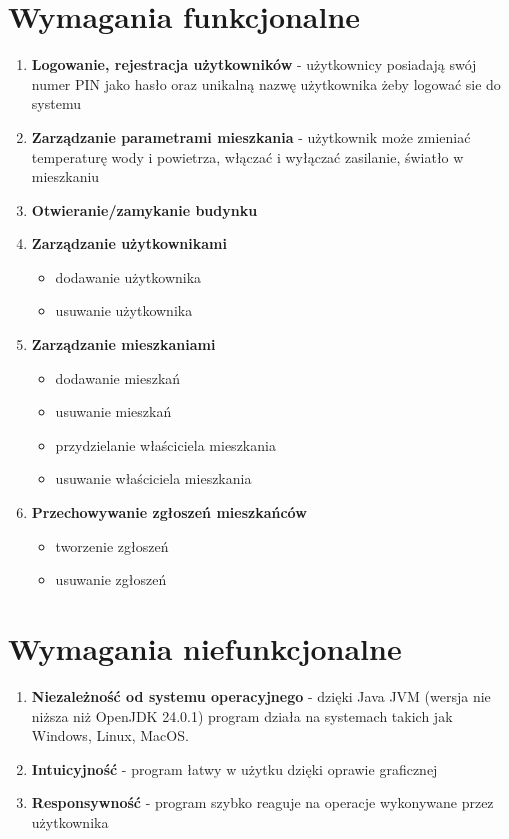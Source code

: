 \section{Wymagania funkcjonalne}
\begin{enumerate}
    \item \textbf{Logowanie, rejestracja użytkowników} - użytkownicy posiadają swój numer PIN jako hasło oraz unikalną nazwę użytkownika żeby logować sie do systemu
    \item \textbf{Zarządzanie parametrami mieszkania} - użytkownik może zmieniać temperaturę wody i powietrza, włączać i wyłączać zasilanie, światło w mieszkaniu
    \item \textbf{Otwieranie/zamykanie budynku}
    \item \textbf{Zarządzanie użytkownikami}
        \begin{itemize}
            \item dodawanie użytkownika
            \item usuwanie użytkownika
        \end{itemize}
    \item \textbf{Zarządzanie mieszkaniami}
        \begin{itemize}
            \item dodawanie mieszkań
            \item usuwanie mieszkań
            \item przydzielanie właściciela mieszkania
            \item usuwanie właściciela mieszkania
        \end{itemize}
    \item \textbf{Przechowywanie zgłoszeń mieszkańców}
        \begin{itemize}
            \item tworzenie zgłoszeń
            \item usuwanie zgłoszeń
        \end{itemize}
\end{enumerate}

\section{Wymagania niefunkcjonalne}
\begin{enumerate}
    \item \textbf{Niezależność od systemu operacyjnego} - dzięki Java \cite{Java} JVM (wersja nie niższa niż OpenJDK 24.0.1) program działa na systemach takich jak Windows, Linux, MacOS. 
    \item \textbf{Intuicyjność} - program łatwy w użytku dzięki oprawie graficznej \cite{Java2}
    \item \textbf{Responsywność} - program szybko reaguje na operacje wykonywane przez użytkownika
\end{enumerate}

